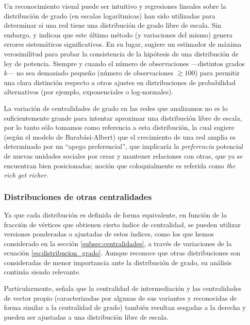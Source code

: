 \documentclass[letterpaper, 11pt]{book}
\theoremstyle{definition}
\theoremstyle{remark}
\begin{document}
Un reconocimiento visual puede ser intuitivo y regresiones lineales sobre la distribución de grado (en escalas logarítmicas) han sido utilizadas para determinar si una red tiene una distribución de grado libre de escala. 
Sin embargo, \citet{2009_PowerLaw_Clauset_EtAl} y \citet{2010_Newman_Networks} indican que este último método (y variaciones del mismo) genera errores sistemáticos significativos. 
En su lugar, \citet{2009_PowerLaw_Clauset_EtAl} sugiere un estimador de máxima verosimilitud para probar la consistencia de la hipótesis de una distribución de ley de potencia. 
Siempre y cuando el número de observaciones ---distintos grados $k$--- no sea demasiado pequeño (número de observaciones $ \gtrsim 100$) para permitir una clara distinción respecto a otros ajustes en distribuciones de probabilidad alternativos (por ejemplo, exponenciales o log-normales). 

La variación de centralidades de grado en las redes que analizamos no es lo suficientemente grande para intentar aproximar una distribución libre de escala, por lo tanto sólo tomamos como referencia a esta distribución, la cual sugiere (según el modelo de Barabási-Albert) que el crecimiento de una red amplia es determinado por un ``apego preferencial'', que implicaría la \emph{preferencia} potencial de nuevas unidades sociales por crear y mantener relaciones con otras, que ya se encuentran bien posicionadas; noción que coloquialmente es referida como \emph{the rich get richer}. 




\subsubsection{Distribuciones de otras centralidades}
\label{subsubsec:OtrasDistribucionesCentralidad}
Ya que cada distribución es definida de forma equivalente, en función de la fracción de vértices que obtienen cierto índice de centralidad, se pueden utilizar versiones ponderadas o ajustadas de estos índices, como los que hemos considerado en la sección \ref{subsec:centralidades}, a través de variaciones de la ecuación \ref{eq:distribucion_grado}. 
Aunque \citet{2010_Newman_Networks} reconoce que otras distribuciones son consideradas de menor importancia ante la distribución de grado, su análisis continúa siendo relevante. 

Particularmente, señala que la centralidad de intermediación y las centralidades de vector propio (caracterizadas por algunas de sus variantes y reconocidas de forma similar a la centralidad de grado) también resultan sesgadas a la derecha y pueden ser ajustadas a una distribución libre de escala. 
\end{document}
